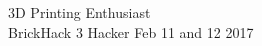 \documentclass[line,margin]{res}
\begin{document}
\begin{resume}
	3D Printing Enthusiast \\
	BrickHack 3 Hacker \hfill Feb 11 and 12 2017

%
%
%
%
\end{resume}
\end{document}
